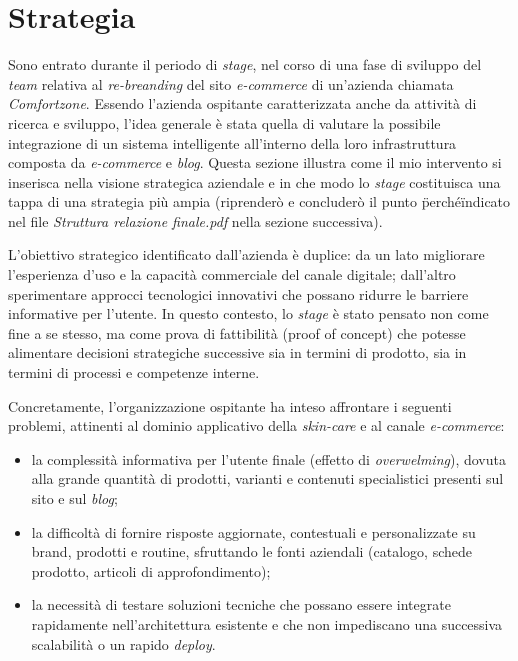 \section{Strategia}

Sono entrato durante il periodo di \emph{stage}, nel corso di una fase di sviluppo del \emph{team} relativa al \emph{re-breanding} del sito \emph{e-commerce} 
di un'azienda chiamata \emph{Comfortzone}. Essendo l'azienda ospitante caratterizzata anche da attività di ricerca e sviluppo, l'idea generale è stata quella di 
valutare la possibile integrazione di un sistema intelligente all'interno della loro infrastruttura composta da \emph{e-commerce} e \emph{blog}. 
Questa sezione illustra come il mio intervento si inserisca nella visione strategica aziendale e in che modo lo 
\emph{stage} costituisca una tappa di una strategia più ampia (riprenderò e concluderò il punto \"perché\" indicato nel file \emph{Struttura relazione finale.pdf} nella sezione successiva).

L'obiettivo strategico identificato dall'azienda è duplice: da un lato migliorare l'esperienza d'uso e la capacità commerciale del canale digitale; 
dall'altro sperimentare approcci tecnologici innovativi che possano ridurre le barriere informative per l'utente. In questo contesto, 
lo \emph{stage} è stato pensato non come fine a se stesso, ma come prova di fattibilità (proof of concept) che potesse alimentare decisioni strategiche successive 
sia in termini di prodotto, sia in termini di processi e competenze interne.

Concretamente, l'organizzazione ospitante ha inteso affrontare i seguenti problemi, attinenti al dominio applicativo della \emph{skin-care} e al canale \emph{e-commerce}:

\begin{itemize}
  \item la complessità informativa per l'utente finale (effetto di \emph{overwelming}), dovuta alla grande quantità di prodotti, varianti e contenuti specialistici presenti sul sito e sul \emph{blog};
  \item la difficoltà di fornire risposte aggiornate, contestuali e personalizzate su brand, prodotti e routine, sfruttando le fonti aziendali (catalogo, schede prodotto, articoli di approfondimento);
  \item la necessità di testare soluzioni tecniche che possano essere integrate rapidamente nell'architettura esistente e che non impediscano una successiva scalabilità o un rapido \emph{deploy}.
\end{itemize}

